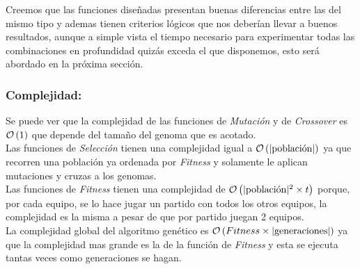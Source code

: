 Creemos que las funciones diseñadas presentan buenas diferencias entre las del mismo tipo y ademas tienen criterios lógicos que
nos deberían llevar a buenos resultados, aunque a simple vista el tiempo necesario para experimentar todas las combinaciones
 en profundidad quizás exceda el que disponemos, esto será abordado en la próxima sección.

 \subsubsection*{Complejidad:}

 Se puede ver que la complejidad de las funciones de \emph{Mutación} y de \emph{Crossover} es $\mathcal{O}\left(1\right)$ que depende del tamaño del genoma que es acotado.\\

 Las funciones de \emph{Selección} tienen una complejidad igual a $\mathcal{O}\left(|\textrm{población}|\right)$ ya que recorren una población ya ordenada por \emph{Fitness}
 y solamente le aplican mutaciones y cruzas a los genomas.\\

 Las funciones de \emph{Fitness} tienen una complejidad de $\mathcal{O}\left(|\textrm{población}|^2 \times t\right)$ porque, por cada equipo, se lo hace jugar
 un partido con todos los otros equipos, la complejidad es la misma a pesar de que por partido juegan 2 equipos.\\

 La complejidad global del algoritmo genético es $\mathcal{O}\left(Fitness \times |\textrm{generaciones}|\right)$ ya que la complejidad mas grande es la de la función
 de \emph{Fitness} y esta se ejecuta tantas veces como generaciones se hagan.

